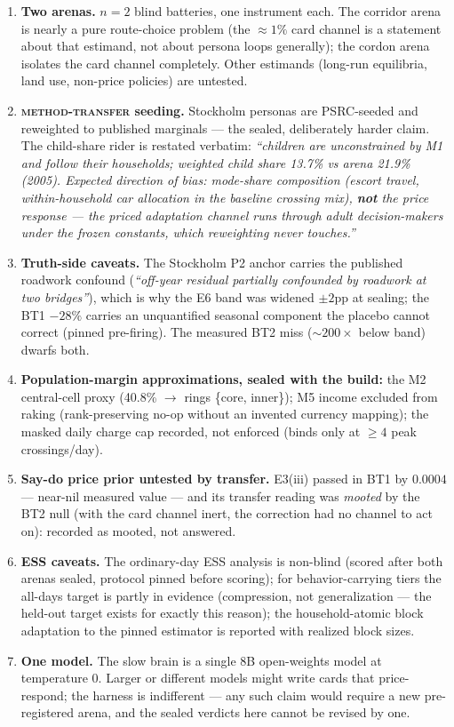 \documentclass[11pt]{article}
\begin{document}
\begin{enumerate}[leftmargin=1.5em,itemsep=2pt]
\item \textbf{Two arenas.} $n=2$ blind batteries, one instrument each.
The corridor arena is nearly a pure route-choice problem (the
$\approx 1\%$ card channel is a statement about that estimand, not
about persona loops generally); the cordon arena isolates the card
channel completely. Other estimands (long-run equilibria, land use,
non-price policies) are untested.
\item \textbf{\textsc{method-transfer} seeding.} Stockholm personas are
PSRC-seeded and reweighted to published marginals --- the sealed,
deliberately harder claim. The child-share rider is restated verbatim:
\emph{``children are unconstrained by M1 and follow their households;
weighted child share 13.7\% vs arena 21.9\% (2005). Expected direction
of bias: mode-share composition (escort travel, within-household car
allocation in the baseline crossing mix), \textbf{not} the price
response --- the priced adaptation channel runs through adult
decision-makers under the frozen constants, which reweighting never
touches.''}
\item \textbf{Truth-side caveats.} The Stockholm P2 anchor carries the
published roadwork confound (\emph{``off-year residual partially
confounded by roadwork at two bridges''}), which is why the E6 band was
widened $\pm 2$pp at sealing; the BT1 $-28\%$ carries an unquantified
seasonal component the placebo cannot correct (pinned pre-firing). The
measured BT2 miss ($\sim 200\times$ below band) dwarfs both.
\item \textbf{Population-margin approximations, sealed with the build:}
the M2 central-cell proxy (40.8\% $\to$ rings \{core, inner\}); M5
income excluded from raking (rank-preserving no-op without an invented
currency mapping); the masked daily charge cap recorded, not enforced
(binds only at $\geq 4$ peak crossings/day).
\item \textbf{Say-do price prior untested by transfer.} E3(iii) passed
in BT1 by $0.0004$ --- near-nil measured value --- and its transfer
reading was \emph{mooted} by the BT2 null (with the card channel inert,
the correction had no channel to act on): recorded as mooted, not
answered.
\item \textbf{ESS caveats.} The ordinary-day ESS analysis is non-blind
(scored after both arenas sealed, protocol pinned before scoring); for
behavior-carrying tiers the all-days target is partly in evidence
(compression, not generalization --- the held-out target exists for
exactly this reason); the household-atomic block adaptation to the
pinned estimator is reported with realized block sizes.
\item \textbf{One model.} The slow brain is a single 8B open-weights
model at temperature 0. Larger or different models might write cards
that price-respond; the harness is indifferent --- any such claim would
require a new pre-registered arena, and the sealed verdicts here cannot
be revised by one.
\end{enumerate}
\end{document}
